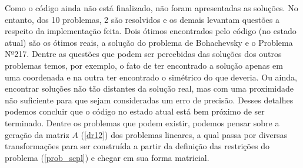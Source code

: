 Como o código ainda não está finalizado, não foram apresentadas as soluções. No entanto, dos 10 problemas, 2 são resolvidos e os demais levantam questões a respeito da implementação feita.
Dois ótimos encontrados pelo código (no estado atual) são os ótimos reais, a solução do
problema de Bohachevsky e o Problema Nº217. Dentre as questões que podem ser percebidas das
soluções dos outros problemas temos, por exemplo, o fato de ter encontrado a solução
apenas em uma coordenada e na outra ter encontrado o simétrico do que deveria. Ou ainda,
encontrar soluções não tão distantes da solução real, mas com uma proximidade não
suficiente para que sejam consideradas um erro de precisão. Desses detalhes podemos
concluir que o código no estado atual está bem próximo de ser terminado. Dentre os
problemas que podem existir, podemos pensar sobre a geração da matriz \(A\) (\ref{dr12})
dos problemas lineares, a qual passa por diversas transformações para ser construída
a partir da definição das restrições do problema (\ref{prob_scpl}) e chegar em sua forma
matricial.